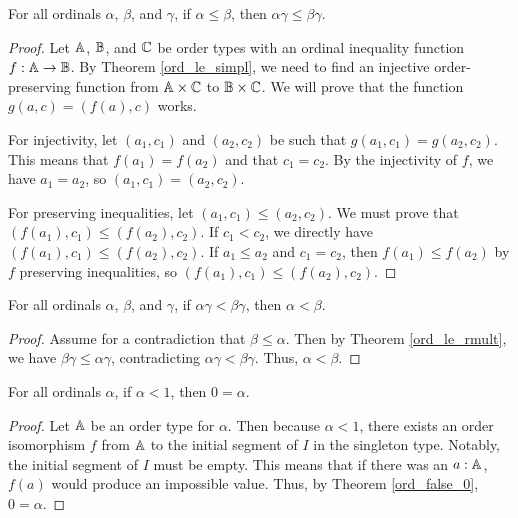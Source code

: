 \documentclass[../../math.tex]{subfiles}
\begin{document}
\begin{theorem} \label{ord_le_rmult}
    For all ordinals $\alpha$, $\beta$, and $\gamma$, if $\alpha \leq \beta$,
    then $\alpha \gamma \leq \beta \gamma$.
\end{theorem}
\begin{proof}
    Let $\mathbb{A}$, $\mathbb{B}$, and $\mathbb{C}$ be order types with an ordinal inequality function
    $f : \mathbb{A} \to \mathbb{B}$.  By Theorem \ref{ord_le_simpl}, we need to find an
    injective order-preserving function from $\mathbb{A} \times \mathbb{C}$ to $\mathbb{B} \times \mathbb{C}$.
    We will prove that the function $g(a, c) = (f(a), c)$ works.

    For injectivity, let $(a_1, c_1)$ and $(a_2, c_2)$ be such that $g(a_1, c_1)
    = g(a_2, c_2)$.  This means that $f(a_1) = f(a_2)$ and that $c_1 = c_2$.  By
    the injectivity of $f$, we have $a_1 = a_2$, so $(a_1, c_1) = (a_2, c_2)$.

    For preserving inequalities, let $(a_1, c_1) \leq (a_2, c_2)$.  We must
    prove that $(f(a_1), c_1) \leq (f(a_2), c_2)$.  If $c_1 < c_2$, we directly
    have $(f(a_1), c_1) \leq (f(a_2), c_2)$.  If $a_1 \leq a_2$ and $c_1 = c_2$,
    then $f(a_1) \leq f(a_2)$ by $f$ preserving inequalities, so $(f(a_1), c_1)
    \leq (f(a_2), c_2)$.
\end{proof}

\begin{theorem} \label{ord_lt_mult_rcancel}
    For all ordinals $\alpha$, $\beta$, and $\gamma$, if $\alpha \gamma < \beta
    \gamma$, then $\alpha < \beta$.
\end{theorem}
\begin{proof}
    Assume for a contradiction that $\beta \leq \alpha$.  Then by Theorem
    \ref{ord_le_rmult}, we have $\beta \gamma \leq \alpha \gamma$, contradicting
    $\alpha \gamma < \beta \gamma$.  Thus, $\alpha < \beta$.
\end{proof}

\begin{theorem} \label{ord_lt_one}
    For all ordinals $\alpha$, if $\alpha < 1$, then $0 = \alpha$.
\end{theorem}
\begin{proof}
    Let $\mathbb{A}$ be an order type for $\alpha$.  Then because $\alpha < 1$, there
    exists an order isomorphism $f$ from $\mathbb{A}$ to the initial segment of $I$ in
    the singleton type.  Notably, the initial segment of $I$ must be empty.
    This means that if there was an $a : \mathbb{A}$, $f(a)$ would produce an impossible
    value.  Thus, by Theorem \ref{ord_false_0}, $0 = \alpha$.
\end{proof}
\end{document}
